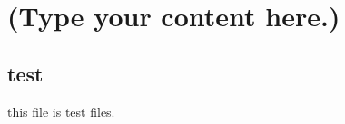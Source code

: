 \documentclass{book}
\begin{document}
\chapter{(Type your content here.)}
\section{test}

this file is test files.
\end{document}

